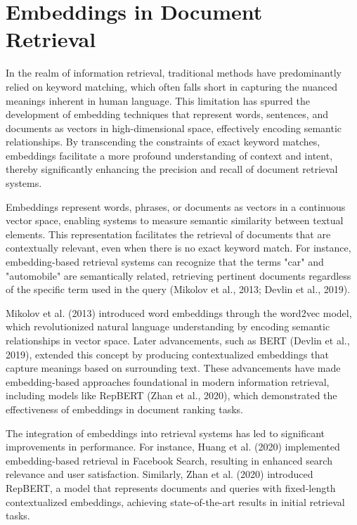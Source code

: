 \section{Embeddings in Document Retrieval}

In the realm of information retrieval, traditional methods have predominantly relied on keyword matching, which often falls short in capturing the nuanced meanings inherent in human language. This limitation has spurred the development of embedding techniques that represent words, sentences, and documents as vectors in high-dimensional space, effectively encoding semantic relationships. By transcending the constraints of exact keyword matches, embeddings facilitate a more profound understanding of context and intent, thereby significantly enhancing the precision and recall of document retrieval systems.

Embeddings represent words, phrases, or documents as vectors in a continuous vector space, enabling systems to measure semantic similarity between textual elements. This representation facilitates the retrieval of documents that are contextually relevant, even when there is no exact keyword match. For instance, embedding-based retrieval systems can recognize that the terms "car" and "automobile" are semantically related, retrieving pertinent documents regardless of the specific term used in the query (Mikolov et al., 2013; Devlin et al., 2019).

Mikolov et al. (2013) introduced word embeddings through the word2vec model, which revolutionized natural language understanding by encoding semantic relationships in vector space. Later advancements, such as BERT (Devlin et al., 2019), extended this concept by producing contextualized embeddings that capture meanings based on surrounding text. These advancements have made embedding-based approaches foundational in modern information retrieval, including models like RepBERT (Zhan et al., 2020), which demonstrated the effectiveness of embeddings in document ranking tasks.

The integration of embeddings into retrieval systems has led to significant improvements in performance. For instance, Huang et al. (2020) implemented embedding-based retrieval in Facebook Search, resulting in enhanced search relevance and user satisfaction. Similarly, Zhan et al. (2020) introduced RepBERT, a model that represents documents and queries with fixed-length contextualized embeddings, achieving state-of-the-art results in initial retrieval tasks.


